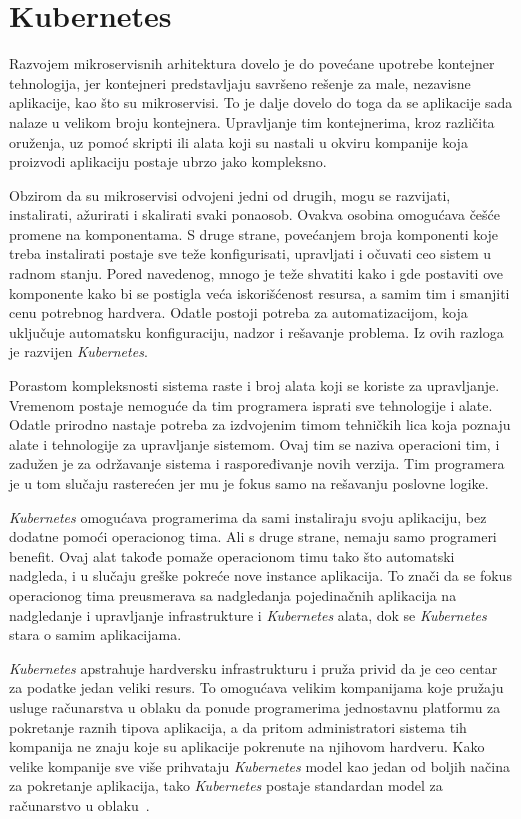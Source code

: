 \section{Kubernetes}\label{sec:kubernetes}

Razvojem mikroservisnih arhitektura dovelo je do povećane upotrebe kontejner tehnologija, jer 
kontejneri predstavljaju savršeno rešenje za male, nezavisne aplikacije, kao što su mikroservisi. 
To je dalje dovelo do toga da se aplikacije sada nalaze u velikom broju kontejnera. Upravljanje 
tim kontejnerima, kroz različita oruženja, uz pomoć skripti ili alata koji su nastali u okviru 
kompanije koja proizvodi aplikaciju postaje ubrzo jako kompleksno. 

Obzirom da su mikroservisi odvojeni jedni od drugih, mogu se razvijati, instalirati, ažurirati i skalirati svaki ponaosob.
Ovakva osobina omogućava češće promene na komponentama. S druge strane, povećanjem broja komponenti koje treba 
instalirati postaje sve teže konfigurisati, upravljati i očuvati ceo sistem u radnom stanju. Pored navedenog, mnogo 
je teže shvatiti kako i gde postaviti ove komponente kako bi se postigla veća iskorišćenost resursa, a samim tim i 
smanjiti cenu potrebnog hardvera. Odatle postoji potreba za automatizacijom, koja uključuje automatsku konfiguraciju,
nadzor  i rešavanje problema. Iz ovih razloga je razvijen \textit{Kubernetes}.

Porastom kompleksnosti sistema raste i broj alata koji se koriste za upravljanje. Vremenom postaje 
nemoguće da tim programera isprati sve tehnologije i alate. Odatle prirodno nastaje potreba za 
izdvojenim timom tehničkih lica koja poznaju alate i tehnologije za upravljanje sistemom. Ovaj tim 
se naziva operacioni tim, i zadužen je za održavanje sistema i raspoređivanje novih verzija. Tim 
programera je u tom slučaju rasterećen jer mu je fokus samo na rešavanju poslovne logike.

\textit{Kubernetes} omogućava programerima da sami instaliraju svoju aplikaciju, bez dodatne pomoći operacionog tima. 
Ali s druge strane, nemaju samo programeri benefit. Ovaj alat takođe pomaže operacionom timu tako što automatski nadgleda, 
i u slučaju greške pokreće nove instance aplikacija. To znači da se fokus operacionog tima preusmerava sa nadgledanja
pojedinačnih aplikacija na nadgledanje i upravljanje infrastrukture i \textit{Kubernetes} alata, dok se \textit{Kubernetes} stara o samim
aplikacijama.

\textit{Kubernetes} apstrahuje hardversku infrastrukturu i pruža privid da je ceo centar za podatke jedan veliki resurs. To omogućava
velikim kompanijama koje pružaju usluge računarstva u oblaku da ponude programerima jednostavnu platformu za pokretanje
raznih tipova aplikacija, a da pritom administratori sistema tih kompanija ne znaju koje su aplikacije pokrenute na njihovom
hardveru. Kako velike kompanije sve više prihvataju \textit{Kubernetes} model kao jedan od boljih načina za pokretanje aplikacija,
tako \textit{Kubernetes} postaje standardan model za računarstvo u oblaku~\cite{KIA}.

